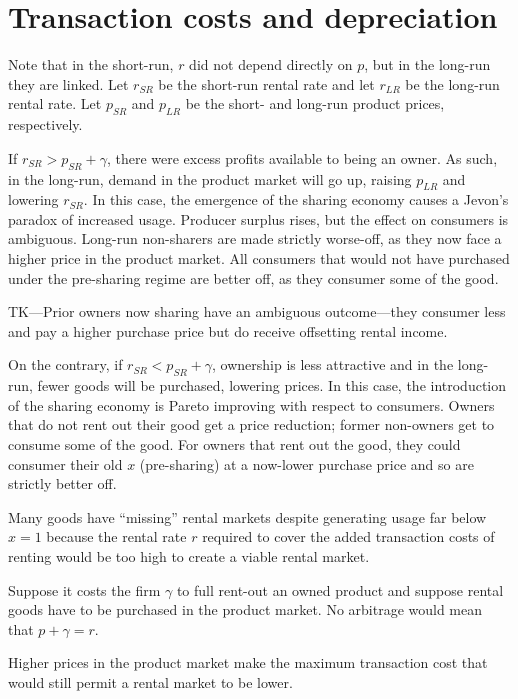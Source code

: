\documentclass[11pt]{article}
\begin{document}
\section{Transaction costs and depreciation}

Note that in the short-run, $r$ did not depend directly on $p$, but in the long-run they are linked. 
Let $r_{SR}$ be the short-run rental rate and let $r_{LR}$ be the long-run rental rate. 
Let $p_{SR}$ and $p_{LR}$ be the short- and long-run product prices, respectively.  

If $r_{SR} > p_{SR} + \gamma$, there were excess profits available to being an owner. 
As such, in the long-run, demand in the product market will go up, raising $p_{LR}$ and lowering $r_{SR}$. 
In this case, the emergence of the sharing economy causes a Jevon's paradox of increased usage. 
Producer surplus rises, but the effect on consumers is ambiguous. 
Long-run non-sharers are made strictly worse-off, as they now face a higher price in the product market. 
All consumers that would not have purchased under the pre-sharing regime are better off, as they consumer some of the good.

TK---Prior owners now sharing have an ambiguous outcome---they consumer less and pay a higher purchase price but do receive offsetting rental income.  

On the contrary, if $r_{SR} < p_{SR} + \gamma$, ownership is less attractive and in the long-run, fewer goods will be purchased, lowering prices. 
In this case, the introduction of the sharing economy is Pareto improving with respect to consumers. 
Owners that do not rent out their good get a price reduction; former non-owners get to consume some of the good. 
For owners that rent out the good, they could consumer their old $x$ (pre-sharing) at a now-lower purchase price and so are strictly better off. 

Many goods have ``missing'' rental markets despite generating usage far below $x = 1$ because the rental rate $r$ required to cover the added transaction costs of renting would be too high to create a viable rental market. 

Suppose it costs the firm $\gamma$ to full rent-out an owned product and suppose rental goods have to be purchased in the product market. 
No arbitrage would mean that $p + \gamma = r$. 

\begin{prop}
Higher prices in the product market make the maximum transaction cost that would still permit a rental market to be lower. 
\end{prop} 
\end{document}
